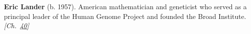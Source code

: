 \textbf{Eric Lander} (b. 1957). American mathematician and geneticist who served as a principal leader of the Human Genome Project and founded the Broad Institute. \emph{[Ch.~\hyperref[ch:dnasequencing]{40}]}

